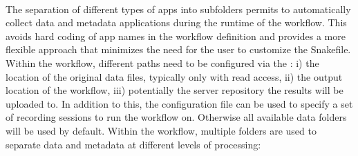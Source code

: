 \renewcommand*\DTstylecomment{\color{gray}\textit}
\renewcommand*\DTstyle{\textcolor{black!90}}
\begin{minipage}[t]{\textwidth}
\ \\
\end{minipage}

The separation of different types of apps into subfolders permits to automatically collect data and metadata applications during the runtime of the  workflow. This avoids hard coding of app names in the workflow definition and provides a more flexible approach that minimizes the need for the user to customize the Snakefile.
Within the  workflow, different paths need to be configured via the : i) the location of the original data files, typically only with read access, ii) the output location of the workflow, iii) potentially the server repository the results will be uploaded to. In addition to this, the configuration file can be used to specify a set of recording sessions to run the workflow on. Otherwise all available data folders will be used by default.
Within the  workflow, multiple folders are used to separate data and metadata at different levels of processing:\\

